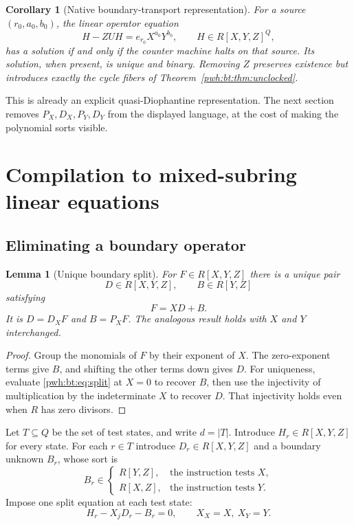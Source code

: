 \documentclass[11pt,letterpaper]{article}
\numberwithin{equation}{section}
\newtheorem{lemma}[theorem]{Lemma}
\newtheorem{corollary}[theorem]{Corollary}
\theoremstyle{definition}
\begin{document}
\begin{corollary}[Native boundary-transport representation]\label{pwh:bt:cor:native}
For a source $(r_0,a_0,b_0)$, the linear operator equation
\begin{equation}\label{pwh:bt:eq:native}
 H-ZUH=e_{r_0}X^{a_0}Y^{b_0},\qquad H\in R[X,Y,Z]^Q,
\end{equation}
has a solution if and only if the counter machine halts on that source.
Its solution, when present, is unique and binary. Removing $Z$ preserves
existence but introduces exactly the cycle fibers of
Theorem~\ref{pwh:bt:thm:unclocked}.
\end{corollary}

This is already an explicit quasi-Diophantine representation. The next
section removes $P_X,D_X,P_Y,D_Y$ from the displayed language, at the
cost of making the polynomial sorts visible.

\section{Compilation to mixed-subring linear equations}\label{pwh:bt:sec:compiler}

\subsection{Eliminating a boundary operator}
\begin{lemma}[Unique boundary split]\label{pwh:bt:lem:split}
For $F\in R[X,Y,Z]$ there is a unique pair
\[
 D\in R[X,Y,Z],\qquad B\in R[Y,Z]
\]
satisfying
\begin{equation}\label{pwh:bt:eq:split}
 F=XD+B.
\end{equation}
It is $D=D_XF$ and $B=P_XF$. The analogous result holds with $X$ and $Y$
interchanged.
\end{lemma}
\begin{proof}
Group the monomials of $F$ by their exponent of $X$. The zero-exponent
terms give $B$, and shifting the other terms down gives $D$. For
uniqueness, evaluate \eqref{pwh:bt:eq:split} at $X=0$ to recover $B$, then use
the injectivity of multiplication by the indeterminate $X$ to recover
$D$. That injectivity holds even when $R$ has zero divisors.
\end{proof}

Let $T\subseteq Q$ be the set of test states, and write $d=|T|$.
Introduce $H_r\in R[X,Y,Z]$ for every state. For each $r\in T$ introduce
$D_r\in R[X,Y,Z]$ and a boundary unknown $B_r$, whose sort is
\begin{equation}\label{pwh:bt:eq:sorts}
 B_r\in\begin{cases}R[Y,Z],&\text{the instruction tests }X,\\
 R[X,Z],&\text{the instruction tests }Y.\end{cases}
\end{equation}
Impose one split equation at each test state:
\begin{equation}\label{pwh:bt:eq:splitrow}
 H_r-X_jD_r-B_r=0,\qquad X_X=X,\ X_Y=Y.
\end{equation}
\end{document}
